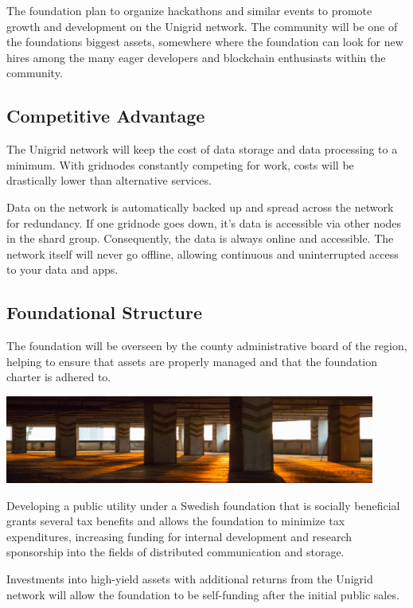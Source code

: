 \documentclass{article}
\begin{document}
The foundation plan to organize hackathons and similar events to promote growth and development on the Unigrid network. The community will be one of the foundations biggest assets, somewhere where the foundation can look for new hires among the many eager developers and blockchain enthusiasts within the community.

\subsection{Competitive Advantage}
The Unigrid network will keep the cost of data storage and data processing to a minimum. With gridnodes constantly competing for work, costs will be drastically lower than alternative services.

Data on the network is automatically backed up and spread across the network for redundancy. If one gridnode goes down, it's data is accessible via other nodes in the shard group. Consequently, the data is always online and accessible. The network itself will never go offline, allowing continuous and uninterrupted access to your data and apps.

\subsection{Foundational Structure}
The foundation will be overseen by the county administrative board of the region, helping to ensure that assets are properly managed and that the foundation charter is adhered to.


\begin{mdframed}[style=textimage]
	\includegraphics[width=345pt]{foundation}
\end{mdframed}

\noindent Developing a public utility under a Swedish foundation that is socially beneficial grants several tax benefits and allows the foundation to minimize tax expenditures, increasing funding for internal development and research sponsorship into the fields of distributed communication and storage.

Investments into high-yield assets with additional returns from the Unigrid network will allow the foundation to be self-funding after the initial public sales.
\end{document}
